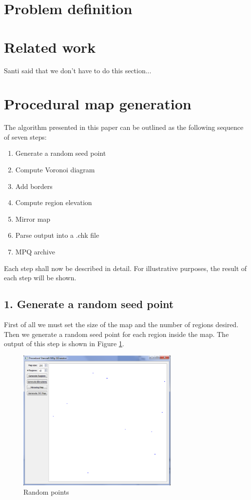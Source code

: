 \documentclass[letterpaper]{article}
\begin{document}
\section{Problem definition} %
\label{sec:problem_definition}




\section{Related work} %
\label{sec:related_work}
Santi said that we don't have to do this section...


\section{Procedural map generation} %
\label{sec:procedural_map_generation}
The algorithm presented in this paper can be outlined as the following sequence of seven steps:
\begin{enumerate}
	\item Generate a random seed point
	\item Compute Voronoi diagram
	\item Add borders
	\item Compute region elevation
	\item Mirror map
	\item Parse output into a .chk file
	\item MPQ archive
\end{enumerate}
Each step shall now be described in detail. For illustrative purposes, the result of each step will be shown.

\subsection{1. Generate a random seed point}
First of all we must set the size of the map and the number of regions desired. Then we generate a random seed point for each region inside the map. The output of this step is shown in Figure \ref{fig:random-points}.

\begin{figure}[h]
    \centering
    \includegraphics[width=8cm]{PCG01.png}
    \caption{Random points}
    \label{fig:random-points}
\end{figure}
\end{document}
